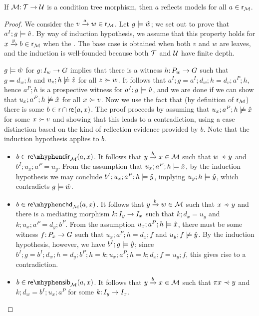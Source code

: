 \begin{lemma}\label{lem:reflection}
If ${\mathcal{M}}{:}\, {\mathcal{T}}\rightarrow {\mathcal{U}}$ is a condition tree morphism, then $a$ reflects models for all $a\in{\mathsf{r}}_{\mathcal{M}}$.
\end{lemma}
%
\begin{proof}
We consider the ${v}\xrightarrow{a}{w}\in {\mathsf{r}}_{\mathcal{M}}$. Let $g\models \hat w$; we set out to prove that $a^I;g\models \hat v$. By way of induction hypothesis, we assume that this property holds for ${x}\xrightarrow{y}{b}\in {\mathsf{r}}_{\mathcal{M}}$ when the . The base case is obtained when both $v$ and $w$ are leaves, and the induction is well-founded because both ${\mathcal{T}}$ and ${\mathcal{U}}$ have finite depth.

$g\models \hat w$ for $g{:}\, I_w\rightarrow G$ implies that there is a witness $h{:}\, P_w\rightarrow G$ such that $g=d_w;h$ and $u_z;h\not\models \hat z$ for all $z\mathrel{\cdot\mskip-8mu\succ} w$. It follows that $a^I;g=a^I;d_w;h=d_v;a^P;h$, hence $a^P;h$ is a prospective witness for $a^I;g\models \hat v$, and we are done if we can show that $u_x;a^P;h\not\models \hat x$ for all $x\mathrel{\cdot\mskip-8mu\succ} v$. Now we use the fact that (by definition of ${\mathsf{r}}_{\mathcal{M}}$) there is some $b\in {\mathsf{r}} \cap \mathsf{re}_{}(a,x)$. The proof proceeds by assuming that $u_x;a^P;h\not\models \hat x$ for some $x\mathrel{\cdot\mskip-8mu\succ} v$ and showing that this leads to a contradiction, using a case distinction based on the kind of reflection evidence provided by $b$. Note that the induction hypothesis applies to $b$.
%
\begin{itemize}
\item $b\in \sdir[\cM]{a,x}$. It follows that ${y}\xrightarrow{b}{x}\in{\mathcal{M}}$ such that $w\mathrel{\prec\mskip-8mu\cdot} y$ and $b^I;u_x;a^P=u_y$. From the assumption that $u_x;a^P;h\models \hat x$, by the induction hypothesis we may conclude $b^I;u_x;a^P;h\models \hat y$, implying $u_y;h\models \hat y$, which contradicts $g\models \hat w$.

\item $b\in \schd[\cM]{a,x}$. It follows that ${y}\xrightarrow{b}{w}\in {\mathcal{M}}$ such that $x\mathrel{\prec\mskip-8mu\cdot} y$ and there is a mediating morphism $k{:}\, I_y\rightarrow I_x$ such that $k;d_x=u_y$ and $k;u_x;a^P=d_y;b^P$. From the assumption $u_x;a^P;h\models \hat x$, there must be some witness $f{:}\, P_x\rightarrow G$ such that $u_x;a^P;h=d_x;f$ and $u_y;f\not\models \hat y$. By the induction hypothesis, however, we have $b^I;g\models \hat y$; since $b^I;g= b^I;d_w;h= d_y;b^P;h= k;u_x;a^P;h=k;d_x;f=u_y;f$, this gives rise to a contradiction.

\item $b\in \ssib[\cM]{a,x}$. It follows that ${y}\xrightarrow{b}{x}\in {\mathcal{M}}$ such that $\pi{x}\mathrel{\prec\mskip-8mu\cdot} y$ and $k;d_w=b^I;u_x;a^P$ for some $k{:}\, I_y\rightarrow I_x$.
\end{itemize}
\end{proof}

